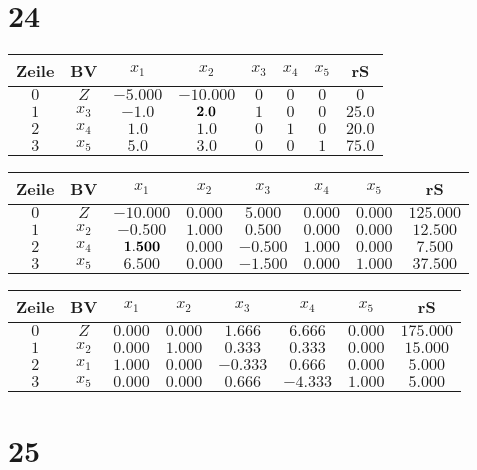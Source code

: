 \documentclass[a4paper]{article}
\begin{document}
\section*{24}

\begin{tabular}{|c|c|cc|ccc|c|} \hline
Zeile & BV & $x_1$ &$x_2$ &$x_3$ &$x_4$ &$x_5$ & rS \\ \hline
$0$ & $Z$ & $-5.000$ &$-10.000$ &$0$ &$0$ &$0$ & $0$ \\ \hline
$1$ & $x_3$ & $-1.0$ &$\bf 2.0$ &$1$ &$0$ &$0$ & $25.0$ \\ 
$2$ & $x_4$ & $1.0$ &$1.0$ &$0$ &$1$ &$0$ & $20.0$ \\ 
$3$ & $x_5$ & $5.0$ &$3.0$ &$0$ &$0$ &$1$ & $75.0$ \\ 
\hline\end{tabular}

\begin{tabular}{|c|c|cc|ccc|c|} \hline
Zeile & BV & $x_1$ &$x_2$ &$x_3$ &$x_4$ &$x_5$ & rS \\ \hline
$0$ & $Z$ & $-10.000$ &$0.000$ &$5.000$ &$0.000$ &$0.000$ & $125.000$ \\ \hline
$1$ & $x_2$ & $-0.500$ &$1.000$ &$0.500$ &$0.000$ &$0.000$ & $12.500$ \\ 
$2$ & $x_4$ & $\bf 1.500$ &$0.000$ &$-0.500$ &$1.000$ &$0.000$ & $7.500$ \\ 
$3$ & $x_5$ & $6.500$ &$0.000$ &$-1.500$ &$0.000$ &$1.000$ & $37.500$ \\ 
\hline\end{tabular}

\begin{tabular}{|c|c|cc|ccc|c|} \hline
Zeile & BV & $x_1$ &$x_2$ &$x_3$ &$x_4$ &$x_5$ & rS \\ \hline
$0$ & $Z$ & $0.000$ &$0.000$ &$1.666$ &$6.666$ &$0.000$ & $175.000$ \\ \hline
$1$ & $x_2$ & $0.000$ &$1.000$ &$0.333$ &$0.333$ &$0.000$ & $15.000$ \\ 
$2$ & $x_1$ & $1.000$ &$0.000$ &$-0.333$ &$0.666$ &$0.000$ & $5.000$ \\ 
$3$ & $x_5$ & $0.000$ &$0.000$ &$0.666$ &$-4.333$ &$1.000$ & $5.000$ \\ 
\hline\end{tabular}



\section*{25}
\end{document}
